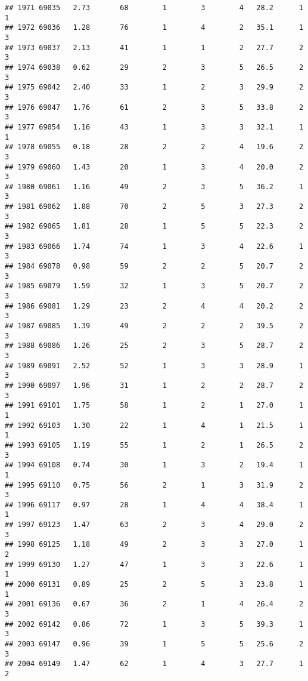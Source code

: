 \documentclass[
]{article}
\begin{document}
\begin{verbatim}
## 1971 69035   2.73       68        1        3        4   28.2      1      1
## 1972 69036   1.28       76        1        4        2   35.1      1      3
## 1973 69037   2.13       41        1        1        2   27.7      2      3
## 1974 69038   0.62       29        2        3        5   26.5      2      3
## 1975 69042   2.40       33        1        2        3   29.9      2      3
## 1976 69047   1.76       61        2        3        5   33.8      2      3
## 1977 69054   1.16       43        1        3        3   32.1      1      1
## 1978 69055   0.18       28        2        2        4   19.6      2      3
## 1979 69060   1.43       20        1        3        4   20.0      2      3
## 1980 69061   1.16       49        2        3        5   36.2      1      3
## 1981 69062   1.88       70        2        5        3   27.3      2      3
## 1982 69065   1.81       28        1        5        5   22.3      2      3
## 1983 69066   1.74       74        1        3        4   22.6      1      3
## 1984 69078   0.98       59        2        2        5   20.7      2      3
## 1985 69079   1.59       32        1        3        5   20.7      2      3
## 1986 69081   1.29       23        2        4        4   20.2      2      3
## 1987 69085   1.39       49        2        2        2   39.5      2      3
## 1988 69086   1.26       25        2        3        5   28.7      2      3
## 1989 69091   2.52       52        1        3        3   28.9      1      3
## 1990 69097   1.96       31        1        2        2   28.7      2      3
## 1991 69101   1.75       58        1        2        1   27.0      1      1
## 1992 69103   1.30       22        1        4        1   21.5      1      1
## 1993 69105   1.19       55        1        2        1   26.5      2      3
## 1994 69108   0.74       30        1        3        2   19.4      1      1
## 1995 69110   0.75       56        2        1        3   31.9      2      3
## 1996 69117   0.97       28        1        4        4   38.4      1      1
## 1997 69123   1.47       63        2        3        4   29.0      2      3
## 1998 69125   1.18       49        2        3        3   27.0      1      2
## 1999 69130   1.27       47        1        3        3   22.6      1      1
## 2000 69131   0.89       25        2        5        3   23.8      1      1
## 2001 69136   0.67       36        2        1        4   26.4      2      3
## 2002 69142   0.86       72        1        3        5   39.3      1      3
## 2003 69147   0.96       39        1        5        5   25.6      2      3
## 2004 69149   1.47       62        1        4        3   27.7      1      2

\end{verbatim}
\end{document}
